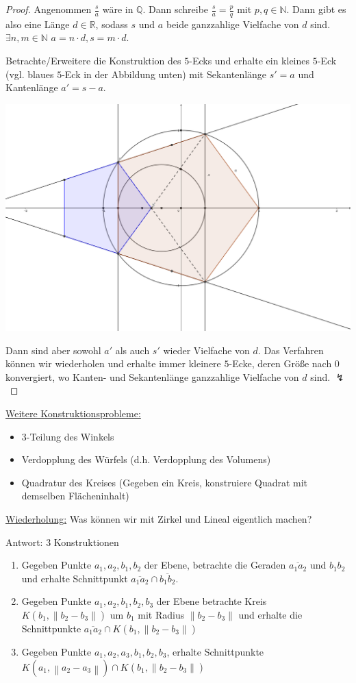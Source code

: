 \documentclass[a4paper,12pt,numbers=noenddot,parskip=full]{scrartcl}
\newcommand{\setN}{\mathbb{N}}
\newcommand{\setQ}{\mathbb{Q}}
\newcommand{\setR}{\mathbb{R}}
\newcommand{\dabs}[1]{{\left\lVert #1 \right\rVert}}
\newcommand{\heading}{\underline}
\theoremstyle{dotless}
\theoremstyle{remark}
\begin{document}
	\begin{proof}
		Angenommen $\frac{s}{a}$ wäre in $\setQ$. Dann schreibe $\frac{s}{a} = \frac{p}{q}$ mit $p,q \in \setN$. Dann gibt es also eine Länge $d \in \setR$, sodass $s$ und $a$ beide ganzzahlige Vielfache von $d$ sind. $\exists n,m \in \setN$  $a = n \cdot d, s= m \cdot d$.
		
		Betrachte/Erweitere die Konstruktion des $5$-Ecks und erhalte ein kleines $5$-Eck (vgl. blaues $5$-Eck in der Abbildung unten) mit Sekantenlänge $s' = a$ und Kantenlänge $a' = s - a$.
		
		\begin{center}
			\includegraphics[width=0.8\linewidth]{bilder/bild2.png}
		\end{center}
	
		Dann sind aber sowohl $a'$ als auch $s'$ wieder Vielfache von $d$. Das Verfahren können wir wiederholen und erhalte immer kleinere $5$-Ecke, deren Größe nach $0$ konvergiert, wo Kanten- und Sekantenlänge ganzzahlige Vielfache von $d$ sind. $\lightning$
	\end{proof}

	\heading{Weitere Konstruktionsprobleme:}
	\begin{itemize}
		\item $3$-Teilung des Winkels
		\item Verdopplung des Würfels (d.h. Verdopplung des Volumens)
		\item Quadratur des Kreises (Gegeben ein Kreis, konstruiere Quadrat mit demselben Flächeninhalt)
	\end{itemize}

	\heading{Wiederholung:} Was können wir mit Zirkel und Lineal eigentlich machen?
	
	Antwort: $3$ Konstruktionen
	\begin{enumerate}
		\item Gegeben Punkte $a_1, a_2, b_1, b_2$ der Ebene, betrachte die Geraden $\overline{a_1 a_2}$ und $b_1 b_2$ und erhalte Schnittpunkt $\overline{a_1 a_2} \cap \overline{b_1 b_2}$.
		\item Gegeben Punkte $a_1, a_2, b_1, b_2, b_3$ der Ebene betrachte Kreis $K(b_1, \dabs{b_2 - b_3})$ um $b_1$ mit Radius $\dabs{b_2 - b_3}$ und erhalte die Schnittpunkte $\overline{a_1 a_2} \cap K(b_1, \dabs{b_2 - b_3})$
		\item Gegeben Punkte $a_1, a_2, a_3, b_1, b_2, b_3$, erhalte Schnittpunkte $K(a_1, \dabs{a_2 - a_3}) \cap K(b_1, \dabs{b_2 - b_3})$
	\end{enumerate}
\end{document}

